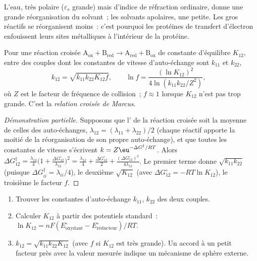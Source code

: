 \admitted

L'eau, très polaire ($\varepsilon_s$ grande) mais d'indice de réfraction
ordinaire, donne une grande réorganisation du solvant~; les solvants
apolaires, une petite. Les gros réactifs se réorganisent moins~: c'est
pourquoi les protéines de transfert d'électron enfouissent leurs sites
métalliques à l'intérieur de la protéine.

\begin{theorem}\label{thm:b3:complex-mechanisms:cross-relation}
Pour une réaction croisée $\mathrm{A_{ox} + B_{red} \to A_{red} + B_{ox}}$ de constante d'équilibre $K_{12}$,
entre des couples dont les constantes de vitesse d'auto-échange sont
$k_{11}$ et $k_{22}$,
\[
  k_{12} = \sqrt{k_{11}k_{22}K_{12}f}, \qquad \ln f = \frac{(\ln K_{12})^2}{4\ln(k_{11}k_{22}/Z^2)},
\]
où $Z$ est le facteur de fréquence de collision~; $f \approx 1$ lorsque
$K_{12}$ n'est pas trop grande. C'est la \emph{relation croisée de Marcus}.
\end{theorem}

\begin{proof}[Démonstration partielle]
Supposons que l' de la réaction croisée soit la
moyenne de celles des auto-échanges, $\lambda_{12} = (\lambda_{11} + \lambda_{22})/2$ (chaque réactif apporte la
moitié de la réorganisation de son propre auto-échange), et que toutes les
constantes de vitesse s'écrivent $k = Z\eu^{-\Delta G^{\ddagger}/RT}$. Alors
$\Delta G_{12}^{\ddagger} = \frac{\lambda_{12}}{4}\bigl(1 + \frac{\Delta G^\circ_{12}}{\lambda_{12}}\bigr)^2 = \frac{\lambda_{12}}{4} + \frac{\Delta G^\circ_{12}}{2} + \frac{(\Delta G^\circ_{12})^2}{4\lambda_{12}}$. Le premier terme donne
$\sqrt{k_{11}k_{22}}$ (puisque $\Delta G^{\ddagger}_{ii} = \lambda_{ii}/4$), le deuxième $\sqrt{K_{12}}$ (avec $\Delta G^\circ_{12} = -RT\ln K_{12}$), le
troisième le facteur $f$.
\end{proof}

\begin{method}\label{met:b3:complex-mechanisms:marcus-estimate}
\begin{enumerate}
  \item Trouver les constantes d'auto-échange $k_{11}$, $k_{22}$ des deux couples.
  \item Calculer $K_{12}$ à partir des potentiels standard~: $\ln K_{12} = nF(E^\circ_{\text{oxydant}} - E^\circ_{\text{réducteur}})/RT$.
  \item $k_{12} = \sqrt{k_{11}k_{22}K_{12}}$ (avec $f$ si $K_{12}$ est très grande). Un accord à un
        petit facteur près avec la valeur mesurée indique un mécanisme de
        sphère externe.
\end{enumerate}
\end{method}

